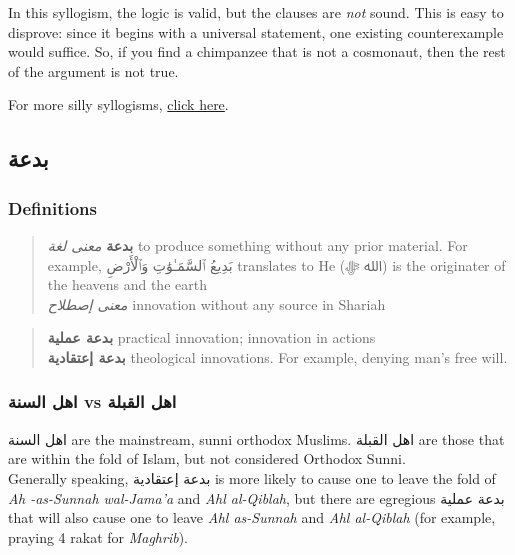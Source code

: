 \documentclass[]{book}
\begin{document}
In this syllogism, the logic is valid, but the clauses are \emph{not} sound. This is easy to disprove: since it begins with a universal statement, one existing counterexample would suffice. So, if you find a chimpanzee that is not a cosmonaut, then the rest of the argument is not true.

For more silly syllogisms, \href{http://krypton.mnsu.edu/~jp5985fj/courses/609/Logic/Silly\%20Syllogisms.htm}{click here}.

\hypertarget{ux628ux62fux639ux629}{%
\subsection{بدعة}\label{ux628ux62fux639ux629}}

\hypertarget{definitions}{%
\subsubsection{Definitions}\label{definitions}}

\begin{quote}
\textbf{بدعة}
\emph{معنى لغة} to produce something without any prior material. For example, بَدِيعُ ٱلسَّمَـٰوَٰتِ وَٱلْأَرْضِ translates to He (الله ﷻ) is the originater of the heavens and the earth\\
\emph{معنى إصطلاح} innovation without any source in Shariah
\end{quote}

\begin{quote}
\textbf{بدعة عملية} practical innovation; innovation in actions\\
\textbf{بدعة إعتقادية} theological innovations. For example, denying man's free will.
\end{quote}

\hypertarget{ux627ux647ux644-ux627ux644ux633ux646ux629-vs-ux627ux647ux644-ux627ux644ux642ux628ux644ux629}{%
\subsubsection{اهل السنة vs اهل القبلة}\label{ux627ux647ux644-ux627ux644ux633ux646ux629-vs-ux627ux647ux644-ux627ux644ux642ux628ux644ux629}}

اهل السنة are the mainstream, sunni orthodox Muslims. اهل القبلة are those that are within the fold of Islam, but not considered Orthodox Sunni.\\
Generally speaking, بدعة إعتقادية is more likely to cause one to leave the fold of \emph{Ah -as-Sunnah wal-Jama'a} and \emph{Ahl al-Qiblah}, but there are egregious بدعة عملية that will also cause one to leave \emph{Ahl as-Sunnah} and \emph{Ahl al-Qiblah} (for example, praying 4 rakat for \emph{Maghrib}).
\end{document}
